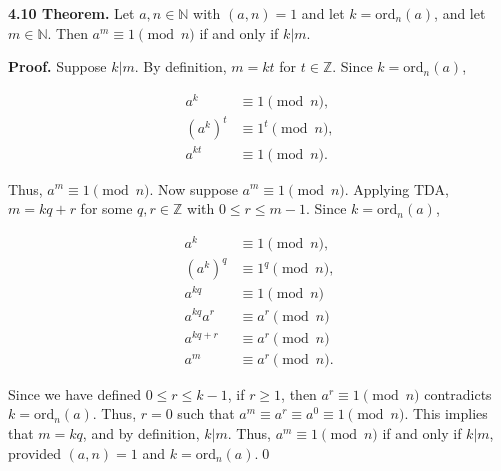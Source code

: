 \documentclass[12pt]{article}
\begin{document}
\noindent\textbf{4.10 Theorem.} Let $a,n\in\mathbb{N}$ with $(a,n)=1$ and let $k=\text{ord}_n(a)$, and let $m\in\mathbb{N}$. Then $a^m\equiv 1\pmod n$ if and only if $k|m$.

\bigskip

\noindent\textbf{Proof.} Suppose $k|m$. By definition, $m=kt$ for $t\in\mathbb{Z}$. Since $k=\text{ord}_n(a)$,

\begin{align*}
a^k &\equiv 1\pmod n,\\
(a^k)^t &\equiv 1^t\pmod n,\\
a^{kt} &\equiv 1\pmod n.
\end{align*}

\noindent Thus, $a^m\equiv 1\pmod n$. Now suppose $a^m\equiv 1\pmod n$. Applying TDA, $m=kq+r$ for some $q,r\in\mathbb{Z}$ with $0\leq r \leq m-1$. Since $k=\text{ord}_n(a)$,

\begin{align*}
a^k &\equiv 1\pmod n,\\
(a^k)^q &\equiv 1^q\pmod n,\\
a^{kq} &\equiv 1\pmod n\\
a^{kq}a^r &\equiv a^r\pmod n\\
a^{kq+r} &\equiv a^r\pmod n\\
a^m &\equiv a^r\pmod n.
\end{align*}

\noindent Since we have defined $0\leq r\leq k-1$, if $r\geq 1$, then $a^r\equiv 1\pmod n$ contradicts $k=\text{ord}_n(a)$. Thus, $r=0$ such that $a^{m} \equiv a^r \equiv a^0 \equiv 1\pmod n$. This implies that $m=kq$, and by definition, $k|m$. Thus, $a^m\equiv 1\pmod n$ if and only if $k|m$, provided $(a,n)=1$ and $k=\text{ord}_n(a)$.\qed
\end{document}
